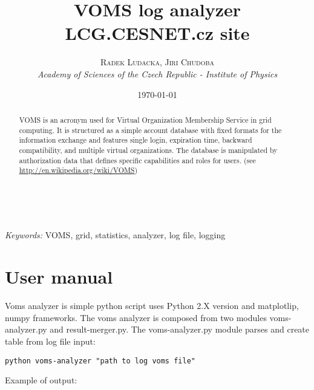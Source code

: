 \documentclass[a4paper, 11pt]{article} %
\title{\textbf{VOMS log analyzer}\\ %
LCG.CESNET.cz site} %
\author{\textsc{Radek Ludacka, Jiri Chudoba} %
\\{\textit{Academy of Sciences of the Czech Republic - Institute of Physics}}} %
\date{\today} %
\makeatletter
\renewcommand{\maketitle}{ %
\begin{flushright} %
{\LARGE\@title} %

\vspace{50pt} %

{\large\@author} %
\\\@date %

\vspace{40pt} %
\end{flushright}
}
\makeatother
\begin{document}
\maketitle %



\begin{abstract}
VOMS is an acronym used for Virtual Organization Membership Service in grid computing. It is structured as a simple account database with fixed formats for the information exchange and features single login, expiration time, backward compatibility, and multiple virtual organizations. The database is manipulated by authorization data that defines specific capabilities and roles for users. 
\linebreak
(see \url{http://en.wikipedia.org/wiki/VOMS})
\end{abstract}

\hspace*{3,6mm}\textit{Keywords:} VOMS, grid, statistics, analyzer, log file, logging %

\vspace{30pt} %


\section*{User manual}

Voms analyzer is simple python script uses Python 2.X version and matplotlip, numpy frameworks. The voms analyzer is composed from two modules voms-analyzer.py and result-merger.py. The voms-analyzer.py module parses and create table from log file input:

\begin{verbatim}
python voms-analyzer "path to log voms file"
\end{verbatim}

Example of output:
\end{document}
